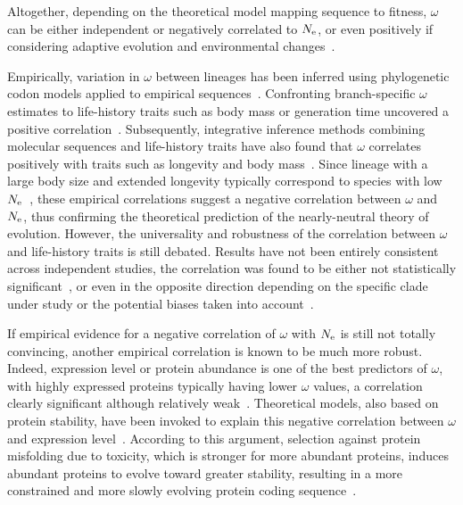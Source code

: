 Altogether, depending on the theoretical model mapping sequence to fitness, $\omega$ can be either independent or negatively correlated to $N_{\text{e}}$, or even positively if considering adaptive evolution and environmental changes~\citep{Lanfear2014}.

Empirically, variation in $\omega$ between lineages has been inferred using phylogenetic \gls{codon} models applied to empirical sequences~\citep{Yang1998,Zhang2004}.
Confronting branch-specific $\omega$ estimates to life-history traits such as body mass or generation time uncovered a positive correlation~\citep{Popadin2007, Nikolaev2007}.
Subsequently, integrative inference methods combining molecular sequences and life-history traits have also found that $\omega$ correlates positively with traits such as longevity and body mass~\citep{Lartillot2011, Figuet2017}.
Since lineage with a large body size and extended longevity typically correspond to species with low $N_{\text{e}}$~\citep{Romiguier2014}, these empirical correlations suggest a negative correlation between $\omega$ and $N_{\text{e}}$, thus confirming the theoretical prediction of the \gls{nearly-neutral} theory of evolution.
However, the universality and robustness of the correlation between $\omega$ and life-history traits is still debated.
Results have not been entirely consistent across independent studies, the correlation was found to be either not statistically significant~\citep{Lartillot2012}, or even in the opposite direction depending on the specific clade under study or the potential biases taken into account~\citep{Lanfear2010, Nabholz2013, Lanfear2014, Figuet2016}.

If empirical evidence for a negative correlation of $\omega$ with $N_{\text{e}}$ is still not totally convincing, another empirical correlation is known to be much more robust.
Indeed, expression level or protein abundance is one of the best predictors of $\omega$, with highly expressed proteins typically having lower $\omega$ values, a correlation clearly significant although relatively weak~\citep{Duret2000, Rocha2004, Drummond2005a, Zhang2015, Song2017}.
Theoretical models, also based on protein stability, have been invoked to explain this negative correlation between $\omega$ and expression level~\citep{Wilke2006, Drummond2008}.
According to this argument, selection against protein misfolding due to toxicity, which is stronger for more abundant proteins, induces abundant proteins to evolve toward greater stability, resulting in a more constrained and more slowly evolving protein coding sequence~\citep{Serohijos2012}.

